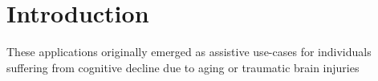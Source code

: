 \section{Introduction}\label{sec:intro}

These applications originally emerged as assistive use-cases for individuals suffering from cognitive decline due to aging or traumatic brain injuries~\cite{Ha2014towards,Satya2019augmenting}

